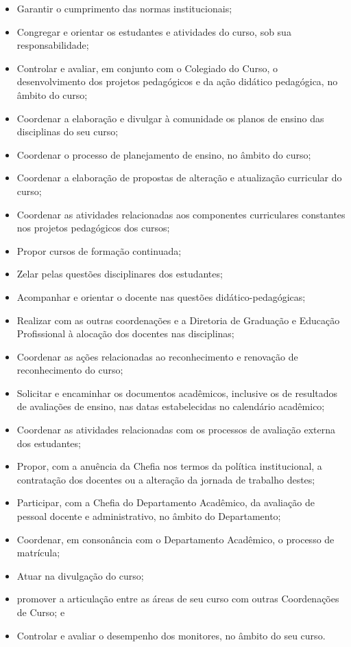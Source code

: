 \begin{itemize}
    \item Garantir o cumprimento das normas institucionais;
    \item Congregar e orientar os estudantes e atividades do curso, sob sua responsabilidade;
    \item Controlar e avaliar, em conjunto com o Colegiado do Curso, o desenvolvimento dos projetos pedagógicos e da ação didático pedagógica, no âmbito do curso;
    \item Coordenar a elaboração e divulgar à comunidade os planos de ensino das disciplinas do seu curso;
    \item Coordenar o processo de planejamento de ensino, no âmbito do curso;
    \item Coordenar a elaboração de propostas de alteração e atualização curricular do curso;
    \item Coordenar as atividades relacionadas aos componentes curriculares constantes nos projetos pedagógicos dos cursos;
    \item Propor cursos de formação continuada;
    \item Zelar pelas questões disciplinares dos estudantes;
    \item Acompanhar e orientar o docente nas questões didático-pedagógicas;
    \item Realizar com as outras coordenações e a Diretoria de Graduação e Educação Profissional à alocação dos docentes nas disciplinas;
    \item Coordenar as ações relacionadas ao reconhecimento e renovação de reconhecimento do curso;
    \item Solicitar e encaminhar os documentos acadêmicos, inclusive os de resultados de avaliações de ensino, nas datas estabelecidas no calendário acadêmico;
    \item Coordenar as atividades relacionadas com os processos de avaliação externa dos estudantes;
    \item Propor, com a anuência da Chefia nos termos da política institucional, a contratação dos docentes ou a alteração da jornada de trabalho destes;
    \item Participar, com a Chefia do Departamento Acadêmico, da avaliação de pessoal docente e administrativo, no âmbito do Departamento;
    \item Coordenar, em consonância com o Departamento Acadêmico, o processo de matrícula;
    \item Atuar na divulgação do curso; 
    \item promover a articulação entre as áreas de seu curso com outras Coordenações de Curso; e
    \item Controlar e avaliar o desempenho dos monitores, no âmbito do seu curso.
\end{itemize}

